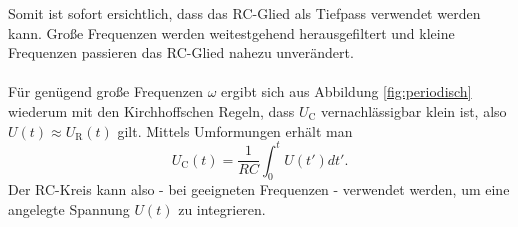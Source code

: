Somit ist sofort ersichtlich, dass das RC-Glied als Tiefpass verwendet werden kann. Große Frequenzen werden weitestgehend herausgefiltert und kleine Frequenzen passieren das RC-Glied nahezu unverändert. \\
\\Für genügend große Frequenzen  $\omega$ ergibt sich aus Abbildung \ref{fig:periodisch} wiederum mit den Kirchhoffschen Regeln, dass $U_\text{C}$ vernachlässigbar klein ist, also $U(t) \approx U_\text{R}(t)$ gilt.
Mittels Umformungen erhält man
\begin{equation}
	U_\text{C}(t)=\frac{1}{RC} \int_{0}^{t} U(t') dt' \text{.}
\end{equation}
Der RC-Kreis kann also - bei geeigneten Frequenzen - verwendet werden,  um eine angelegte Spannung $U(t)$ zu integrieren.
